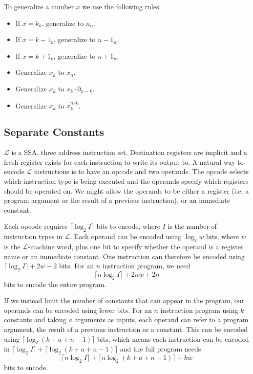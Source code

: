 \documentclass[a4paper]{llncs}
\begin{document}
To generalize a number $x$ we use the following rules:

\begin{itemize}
 \item If $x = k_k$, generalize to $n_n$.
 \item If $x = k-1_k$, generalize to $n-1_n$.
 \item If $x = k+1_k$, generalize to $n+1_n$.
 \item Generalize $x_k$ to $x_n$.
 \item Generalize $x_k$ to $x_k \cdot 0_{n-k}$.
 \item Generalize $x_k$ to $x_k^{n / k}$.
\end{itemize}


\subsection{Separate Constants}

$\mathcal{L}$ is a SSA, three address instruction set.  Destination registers
are implicit and a fresh register exists for each instruction to write its
output to.  A natural way to encode $\mathcal{L}$ instructions is to have an
opcode and two operands.  The opcode selects which instruction type is being
executed and the operands specify which registers should be operated on.
We might allow the operands to be either a register (i.e. a program argument
or the result of a previous instruction), or an immediate constant.

Each opcode requires $\lceil \log_2 I \rceil$ bits to encode, where $I$ is the number
of instruction types in $\mathcal{L}$.  Each operand can be encoded using
$\log_2 w$ bits, where $w$ is the $\mathcal{L}$-machine word, plus one
bit to specify whether the operand is a register name or an immediate constant.
One instruction can therefore be encoded using $\lceil \log_2 I \rceil + 2w + 2$ bits.
For an $n$ instruction program, we need $$\lceil n \log_2 I \rceil + 2nw + 2n$$ bits to encode
the entire program.

If we instead limit the number of constants that can appear in the program,
our operands can be encoded using fewer bits.  For an $n$ instruction program
using $k$ constants and taking $a$ arguments as inputs, each operand can refer
to a program argument, the result of a previous instruction or a constant.
This can be encoded using $\lceil \log_2 (k+a+n-1) \rceil$ bits, which means each instruction
can be encoded in $\lceil \log_2 I \rceil + \lceil \log_2 (k + a + n - 1) \rceil$ and the full program
needs $$\lceil n \log_2 I \rceil + \lceil n \log_2 (k + a + n - 1) \rceil + kw$$ bits to encode.
\end{document}

